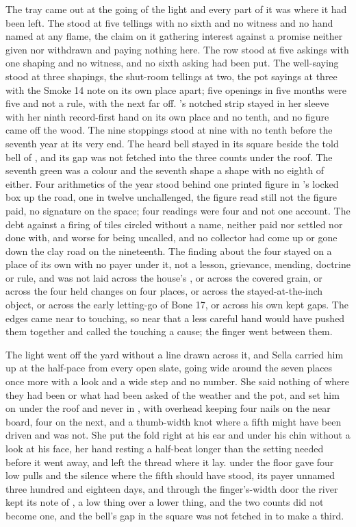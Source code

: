 \scenebreak

The tray came out at the going of the light and every part of it was where it had been left. The  stood at five tellings with no sixth and no witness and no hand named at any flame, the claim on it gathering interest against a promise neither given nor withdrawn and paying nothing here. The row stood at five askings with one shaping and no witness, and no sixth asking had been put. The well-saying stood at three shapings, the shut-room tellings at two, the pot sayings at three with the Smoke 14 note on its own place apart; five openings in five months were five and not a rule, with the next far off. 's notched strip stayed in her sleeve with her ninth record-first hand on its own place and no tenth, and no figure came off the wood. The nine stoppings stood at nine with no tenth before the seventh year at its very end. The heard bell stayed in its square beside the told bell of , and its gap was not fetched into the three counts under the roof. The seventh green was a colour and the seventh shape a shape with no eighth of either. Four arithmetics of the year stood behind one printed figure in 's locked box up the road, one in twelve unchallenged, the figure read still not the figure paid, no signature on the space; four readings were four and not one account. The debt against a firing of tiles circled without a name, neither paid nor settled nor done with, and worse for being uncalled, and no collector had come up or gone down the clay road on the nineteenth. The finding about the four stayed on a place of its own with no payer under it, not a lesson, grievance, mending, doctrine or rule, and was not laid across the house's , or across the covered grain, or across the four held changes on four places, or across the stayed-at-the-inch object, or across the early letting-go of Bone 17, or across his own kept gaps. The edges came near to touching, so near that a less careful hand would have pushed them together and called the touching a cause; the finger went between them.

The light went off the yard without a line drawn across it, and Sella carried him up at the half-pace from every open slate, going wide around the seven places once more with a look and a wide step and no number. She said nothing of where they had been or what had been asked of the weather and the pot, and set him on  under the roof and never in , with  overhead keeping four nails on the near board, four on the next, and a thumb-width knot where a fifth might have been driven and was not. She put the fold right at his ear and under his chin without a look at his face, her hand resting a half-beat longer than the setting needed before it went away, and left the thread where it lay.  under the floor gave four low pulls and the silence where the fifth should have stood, its payer unnamed three hundred and eighteen days, and through the finger's-width door the river kept its note of , a low thing over a lower thing, and the two counts did not become one, and the bell's gap in the square was not fetched in to make a third.

